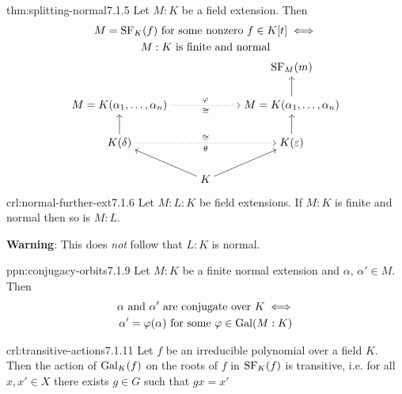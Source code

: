 \documentclass[landscape, 8pt]{extarticle}
\begin{document}
\begin{multicols}{3}
\begin{thm}{thm:splitting-normal}{7.1.5}
    Let $M : K$ be a field extension. Then
    \begin{multline*}
        M = \mathrm{SF}_{K}(f) \text{ for some nonzero } f \in K[t] \iff \\
        M : K \text{ is finite and normal}
    \end{multline*}
\[\begin{tikzcd}[cramped]
	&& {\SF_M(m)} \\
	{M = K(\alpha_1,\dots,\alpha_n)} && {M = K(\alpha_1,\dots,\alpha_n)} \\
	{K(\delta)} && {K(\epsilon)} \\
	& K
	\arrow["\phi", "\cong"', dotted, from=2-1, to=2-3]
	\arrow[from=2-3, to=1-3]
	\arrow[from=3-1, to=2-1]
	\arrow["\theta"', "\cong", dotted, from=3-1, to=3-3]
	\arrow[from=3-3, to=2-3]
	\arrow[from=4-2, to=3-1]
	\arrow[from=4-2, to=3-3]
\end{tikzcd}\]
\end{thm}

\newpage
\begin{crl}{crl:normal-further-ext}{7.1.6}
    Let $M : L : K$ be field extensions. If $M : K$ is finite and normal then so is $M : L$.

    \longrule{0.08ex}
    \textbf{Warning}: This does \textit{not} follow that $L : K$ is normal.
\end{crl}

\begin{ppn}{ppn:conjugacy-orbits}{7.1.9}
    Let $M : K$ be a finite normal extension and $\alpha,\, \alpha'\in M$. Then
    \begin{multline*}
        \alpha \text{ and } \alpha' \text{ are conjugate over }K \iff \\
        \alpha' = \varphi(\alpha) \text{ for some } \varphi \in \operatorname{Gal}(M : K)
    \end{multline*}
\end{ppn}

\begin{crl}{crl:transitive-actions}{7.1.11}
    Let $f$ be an irreducible polynomial over a field $K$. Then the action of $\operatorname{Gal}_{K}(f)$ on the roots of $f$ in $\mathrm{SF}_{K}(f)$ is transitive, i.e. for all $x, x'\in X$ there exists $g\in G$ such that $gx = x'$
\end{crl}


\end{multicols}
\end{document}
